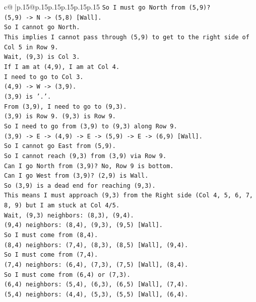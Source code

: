 \documentclass{article}
\begin{document}
{\begin{supertabular}{c@{$\;$}|p{.15\linewidth}@{}p{.15\linewidth}p{.15\linewidth}p{.15\linewidth}p{.15\linewidth}p{.15\linewidth}}
{{{\texttt{So I must go North from (5,9)?} \\
\texttt{(5,9) {-}> N {-}> (5,8) {[}Wall{]}.} \\
\texttt{So I cannot go North.} \\
\texttt{This implies I cannot pass through (5,9) to get to the right side of Col 5 in Row 9.} \\
\texttt{Wait, (9,3) is Col 3.} \\
\texttt{If I am at (4,9), I am at Col 4.} \\
\texttt{I need to go to Col 3.} \\
\texttt{(4,9) {-}> W {-}> (3,9).} \\
\texttt{(3,9) is '.'.} \\
\texttt{From (3,9), I need to go to (9,3).} \\
\texttt{(3,9) is Row 9. (9,3) is Row 9.} \\
\texttt{So I need to go from (3,9) to (9,3) along Row 9.} \\
\texttt{(3,9) {-}> E {-}> (4,9) {-}> E {-}> (5,9) {-}> E {-}> (6,9) {[}Wall{]}.} \\
\texttt{So I cannot go East from (5,9).} \\
\texttt{So I cannot reach (9,3) from (3,9) via Row 9.} \\
\texttt{Can I go North from (3,9)? No, Row 9 is bottom.} \\
\texttt{Can I go West from (3,9)? (2,9) is Wall.} \\
\texttt{So (3,9) is a dead end for reaching (9,3).} \\
\texttt{This means I must approach (9,3) from the Right side (Col 4, 5, 6, 7, 8, 9) but I am stuck at Col 4/5.} \\
\texttt{Wait, (9,3) neighbors: (8,3), (9,4).} \\
\texttt{(9,4) neighbors: (8,4), (9,3), (9,5) {[}Wall{]}.} \\
\texttt{So I must come from (8,4).} \\
\texttt{(8,4) neighbors: (7,4), (8,3), (8,5) {[}Wall{]}, (9,4).} \\
\texttt{So I must come from (7,4).} \\
\texttt{(7,4) neighbors: (6,4), (7,3), (7,5) {[}Wall{]}, (8,4).} \\
\texttt{So I must come from (6,4) or (7,3).} \\
\texttt{(6,4) neighbors: (5,4), (6,3), (6,5) {[}Wall{]}, (7,4).} \\
\texttt{(5,4) neighbors: (4,4), (5,3), (5,5) {[}Wall{]}, (6,4).} \\
}}}
\end{supertabular}}
\end{document}
